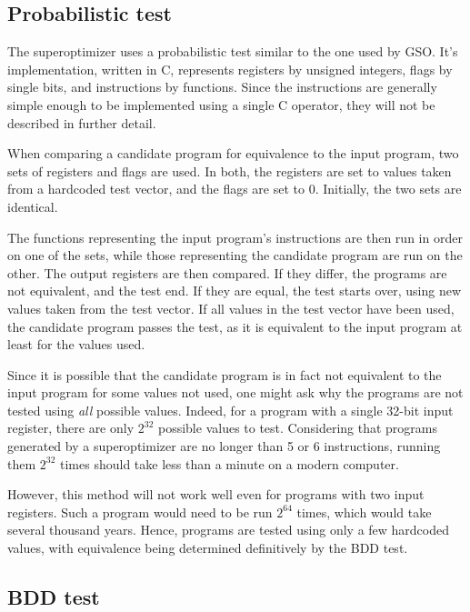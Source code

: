 \documentclass[a4paper,11pt]{kth-mag}
\begin{document}
\subsection{Probabilistic test}
\label{ss:probabilistic_test}

The superoptimizer uses a probabilistic test similar to the one used by GSO.
It's implementation, written in C, represents registers by unsigned integers, flags by single bits, and instructions by functions.
Since the instructions are generally simple enough to be implemented using a single C operator, they will not be described in further detail.

When comparing a candidate program for equivalence to the input program, two sets of registers and flags are used.
In both, the registers are set to values taken from a hardcoded test vector, and the flags are set to 0.
Initially, the two sets are identical.

The functions representing the input program's instructions are then run in order on one of the sets, while those representing the candidate program are run on the other.
The output registers are then compared.
If they differ, the programs are not equivalent, and the test end.
If they are equal, the test starts over, using new values taken from the test vector.
If all values in the test vector have been used, the candidate program passes the test, as it is equivalent to the input program at least for the values used.

Since it is possible that the candidate program is in fact not equivalent to the input program for some values not used, one might ask why the programs are not tested using \emph{all} possible values.
Indeed, for a program with a single 32-bit input register, there are only $2^{32}$ possible values to test.
Considering that programs generated by a superoptimizer are no longer than 5 or 6 instructions, running them $2^{32}$ times should take less than a minute on a modern computer.

However, this method will not work well even for programs with two input registers.
Such a program would need to be run $2^{64}$ times, which would take several thousand years.
Hence, programs are tested using only a few hardcoded values, with equivalence being determined definitively by the BDD test.

\subsection{BDD test}
\label{ss:bdd_test}
\end{document}
